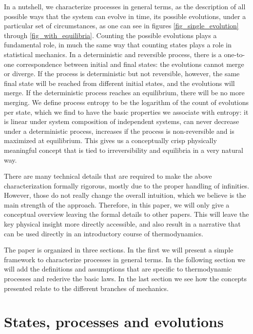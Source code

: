 \documentclass[letterpaper,twocolumn]{article}
\begin{document}
In a nutshell, we characterize processes in general terms, as the description of all possible ways that the system can evolve in time, its possible evolutions, under a particular set of circumstances, as one can see in figures \ref{fig_single_evolution} through \ref{fig_with_equilibria}. Counting the possible evolutions plays a fundamental role, in much the same way that counting states plays a role in statistical mechanics. In a deterministic and reversible process, there is a one-to-one correspondence between initial and final states: the evolutions cannot merge or diverge. If the process is deterministic but not reversible, however, the same final state will be reached from different initial states, and the evolutions will merge. If the deterministic process reaches an equilibrium, there will be no more merging. We define process entropy to be the logarithm of the count of evolutions per state, which we find to have the basic properties we associate with entropy: it is linear under system composition of independent systems, can never decrease under a deterministic process, increases if the process is non-reversible and is maximized at equilibrium. This gives us a conceptually crisp physically meaningful concept that is tied to irreversibility and equilibria in a very natural way.

There are many technical details that are required to make the above characterization formally rigorous, mostly due to the proper handling of infinities. However, those do not really change the overall intuition, which we believe is the main strength of the approach. Therefore, in this paper, we will only give a conceptual overview leaving the formal details to other papers. This will leave the key physical insight more directly accessible, and also result in a narrative that can be used directly in an introductory course of thermodynamics.

The paper is organized in three sections. In the first we will present a simple framework to characterize processes in general terms. In the following section we will add the definitions and assumptions that are specific to thermodynamic processes and rederive the basic laws. In the last section we see how the concepts presented relate to the different branches of mechanics.

\section{States, processes and evolutions}\label{sec_process_entropy}
\end{document}
